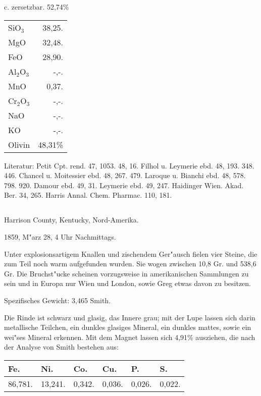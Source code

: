 \documentclass[a4paper, 11pt, oneside]{article}
\begin{document}
\begin{center}
c. zersetzbar. 52,74\%
\end{center}

\begin{table}[H]
    \centering\swabfamily\Large
    \begin{tabular}{l r}
        SiO$_{3}$ & 38,25. \\
        MgO & 32,48. \\
        FeO & 28,90. \\
        Al$_{2}$O$_{3}$ & -,-. \\
        MnO & 0,37. \\
        Cr$_{2}$O$_{3}$ & -,-. \\
        NaO & -,-. \\
        KO & -,-. \\ \hline
        Olivin & 48,31\% \\
    \end{tabular}
\end{table}

\normalsize
Literatur: Petit Cpt. rend. 47, 1053. 48, 16. Filhol u. Leymerie ebd. 48, 193. 348. 446. Chancel u. Moitessier ebd. 48, 267. 479. Laroque u. Bianchi ebd. 48, 578. 798. 920. Damour ebd. 49, 31. Leymerie ebd. 49, 247. Haidinger Wien. Akad. Ber. 34, 265. Harris Annal. Chem. Pharmac. 110, 181.

\subsection{}
\LARGE
\paragraph{}
Harrison County, Kentucky, Nord-Amerika.

1859, M"arz 28, 4 Uhr Nachmittags.

Unter explosionsartigem Knallen und zischendem Ger"ausch fielen vier Steine, die zum Teil noch warm aufgefunden wurden. Sie wogen zwischen 10,8 Gr. und 538,6 Gr. Die Bruchst"ucke scheinen vorzugsweise in amerikanischen Sammlungen zu sein und in Europa nur Wien und London, sowie Greg etwas davon zu besitzen.

Spezifisches Gewicht: 3,465 Smith.

Die Rinde ist schwarz und glasig, das Innere grau; mit der Lupe lassen sich darin metallische Teilchen, ein dunkles glasiges Mineral, ein dunkles mattes, sowie ein wei"ses Mineral erkennen. Mit dem Magnet lassen sich 4,91\% ausziehen, die nach der Analyse von Smith bestehen aus:
\begin{table}[H]
    \centering\swabfamily\Large
    \begin{tabular}{l l l l l l}
        Fe. & Ni. & Co. & Cu. & P. & S. \\ \hline
        86,781. & 13,241. & 0,342. & 0,036. & 0,026. & 0,022. \\
    \end{tabular}
\end{table}
\end{document}
